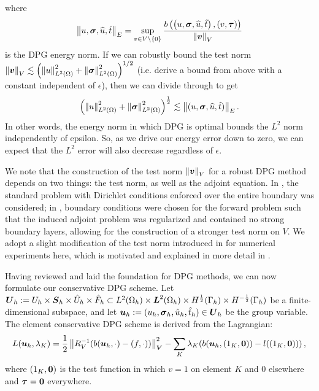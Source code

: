 \documentclass[Proposal.tex]{subfiles}
\begin{document}
where
\[
\left\| u,\boldsymbol\sigma,\widehat{u},\hat t \right\|_E = \sup_{v\in
V\setminus\left\{ 0 \right\}}\frac{b\left( \left( u,\boldsymbol\sigma,\widehat{u},\hat t \right),\left( v,\boldsymbol\tau \right) \right)}{\left\| \boldsymbol v \right\|_V}
\]
is the DPG energy norm.  If we can robustly bound the test norm $\left\| \boldsymbol v \right\|_V
\lesssim \left( \left\| u \right\|_{L^2\left( \Omega \right)}^2+\left\| \boldsymbol\sigma \right\|^2_{L^2\left( \Omega \right)} \right)^{1/2}$ (i.e. derive a
bound from above with a constant independent of $\epsilon$), then we can
divide through to get
\begin{equation}
\left( \left\| u \right\|_{L^2\left( \Omega \right)}^2 + \left\| \boldsymbol\sigma \right\|_{L^2\left( \Omega \right)}^2 \right)^{\frac{1}{2}} \lesssim
\left\| (u,\boldsymbol\sigma,\widehat{u},\hat t) \right\|_E.
\label{eq:robustBound}
\end{equation}
In other words, the energy norm in which DPG 
is optimal bounds the $L^2$ norm independently of epsilon.  So, as
we drive our energy error down to zero, we
can expect that the $L^2$ error will also decrease regardless of $\epsilon$.

We note that the construction of the test norm $\left\| \boldsymbol v \right\|_V$ for a robust DPG
method depends on two things: the test norm, as well as the adjoint equation.
In \cite{DemkowiczHeuer}, the standard problem with Dirichlet conditions
enforced over the entire boundary was considered; in
\cite{ChanHeuerThanhDemkowicz2012}, boundary conditions were chosen for the
forward problem such that the induced adjoint problem was regularized and
contained no strong boundary layers, allowing for the construction of a
stronger test norm on $V$.  We adopt a slight modification of the test norm
introduced in \cite{ChanHeuerThanhDemkowicz2012} for numerical experiments
here, which is motivated and explained in more detail in
\cite{JesseDissertation}.


Having reviewed and laid the foundation for DPG methods, we can now formulate our conservative DPG scheme.  %
Let $\boldsymbol{U}_h:=U_h\times\boldsymbol{S}_h\times\hat U_h\times\hat F_h\subset L^2(\Omega_h)\times\boldsymbol{L}^2(\Omega_h)\times H^{\frac{1}{2}}(\Gamma_h)\times H^{-\frac{1}{2}}(\Gamma_h)$
be a finite-dimensional subspace, and let 
$\boldsymbol{u}_h:=(u_h,\boldsymbol\sigma_h,\hat u_h,\hat t_h)\in\boldsymbol{U}_h$ 
be the group variable. The element conservative DPG scheme is
derived from the Lagrangian:
\begin{equation}
L(\boldsymbol{u}_h,\lambda_K)=\frac{1}{2}\left\| R_V^{-1}(b(\boldsymbol{u}_h,\cdot)-(f,\cdot)) \right\|^2_{\boldsymbol{V}}-\sum_K\lambda_K(b(\boldsymbol{u}_h,(1_K,\boldsymbol{0}))-l((1_K,\boldsymbol{0})))\,,
\label{eq:lagrangian}
\end{equation}
where $(1_K,\boldsymbol{0})$ is the test function in which $v=1$ on element $K$ and 0 elsewhere and $\boldsymbol\tau=\boldsymbol{0}$ everywhere.
\end{document}
